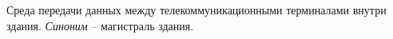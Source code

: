 Среда передачи данных между телекоммуникационными
терминалами внутри здания. {\it Синоним} -- магистраль здания.